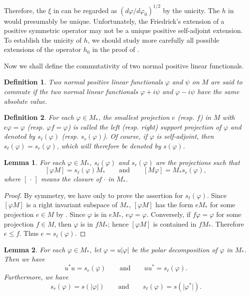 \documentclass[12pt,b5paper,twoside]{article}
\theoremstyle{takesaki}
\newtheorem{lemma}{Lemma}[section]
\newtheorem{definition}{Definition}[section]
\numberwithin{equation}{section}
\begin{document}
Therefore, the $\xi$ in  can be regarded as
$(d\varphi/d\varphi_0)^{1/2}$ by the unicity.  The $h$ in
 would presumably be unique.  Unfortunately, the
Friedrick's extension of a positive symmetric operator may not be a
unique positive self-adjoint extension.  To establish the unicity of
$h$, we should study more carefully all possible extensions of the
operator $h_0$ in the proof of .

Now we shall define the commutativity of two normal positive linear
functionals.

\begin{definition}
\label{def:15.1}
Two normal positive linear functionals $\varphi$ and $\psi$ on $M$ are
said to \emph{commute} if the two normal linear functionals
$\varphi+i\psi$ and $\varphi-i\psi$ have the same absolute value.
\end{definition}

\begin{definition}
\label{def:15.2}
For each $\varphi\in M_*$, the smallest projection $e$ (resp. $f$) in
$M$ with $e\varphi=\varphi$ (resp. $\varphi f=\varphi$) is called the
\emph{left} (resp. \emph{right}) \emph{support projection} of $\varphi$
and denoted by $s_{\ell}(\varphi)$ (resp. $s_r(\varphi)$).  Of course, if
$\varphi$ is self-adjoint, then
$s_{\ell}(\varphi)=s_r(\varphi)$, which will therefore be denoted by
$s(\varphi)$.
\end{definition}

\begin{lemma}
\label{lem:15.5}
For each $\varphi\in M_*$, $s_{\ell}(\varphi)$ and $s_r(\varphi)$ are the
projections such that
\[
  [\varphi M]=s_{\ell}(\varphi)M_*
  \qquad\text{and}\qquad
  [M\varphi]=M_*s_r(\varphi),
\]
where $[\,\cdot\,]$ means the closure of $\cdot$ in $M_*$.
\end{lemma}

\begin{proof}
By symmetry, we have only to prove the assertion for
$s_{\ell}(\varphi)$.  Since $[\varphi M]$ is a right invariant subspace
of $M_*$, $[\varphi M]$ has the form $eM_*$ for some projection $e\in M$
by \cite{ref19}.  Since $\varphi$ is in $eM_*$, $e\varphi=\varphi$.
Conversely, if $f\varphi=\varphi$ for some projection $f\in M$, then
$\varphi$ is in $fM_*$; hence $[\varphi M]$ is contained in $fM_*$.  Therefore
$e\leq f$.  Thus $e=s_{\ell}(\varphi)$.
\end{proof}

\begin{lemma}
\label{lem:15.6}
For each $\varphi\in M_*$, let $\varphi=u\lvert\varphi\rvert$ be the
polar decomposition of $\varphi$ in $M_*$.  Then we have
\begin{equation}
  u^*u=s_r(\varphi)
  \qquad\text{and}\qquad
  uu^*=s_{\ell}(\varphi).
  \label{eq:15.5}
\end{equation}
Furthermore, we have
\[
  s_r(\varphi)=s(\lvert\varphi\rvert)
  \qquad\text{and}\qquad
  s_{\ell}(\varphi)=s(\lvert\varphi^*\rvert).
\]
\end{lemma}
\end{document}
